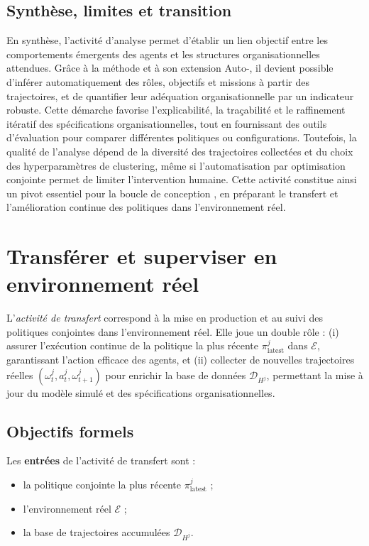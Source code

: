 \section{Synthèse, limites et transition}

En synthèse, l’activité d’analyse permet d’établir un lien objectif entre les comportements émergents des agents et les structures organisationnelles attendues. Grâce à la méthode  et à son extension Auto-, il devient possible d’inférer automatiquement des rôles, objectifs et missions à partir des trajectoires, et de quantifier leur adéquation organisationnelle par un indicateur robuste. Cette démarche favorise l’explicabilité, la traçabilité et le raffinement itératif des spécifications organisationnelles, tout en fournissant des outils d’évaluation pour comparer différentes politiques ou configurations. Toutefois, la qualité de l’analyse dépend de la diversité des trajectoires collectées et du choix des hyperparamètres de clustering, même si l’automatisation par optimisation conjointe permet de limiter l’intervention humaine. Cette activité constitue ainsi un pivot essentiel pour la boucle de conception , en préparant le transfert et l’amélioration continue des politiques dans l’environnement réel.


\clearpage
\thispagestyle{empty}
\null
\newpage

\chapter{Transférer et superviser en environnement réel}
\label{chap:transferring}

L'\textit{activité de transfert} correspond à la mise en production et au suivi des politiques conjointes dans l’environnement réel.
Elle joue un double rôle : (i) assurer l’exécution continue de la politique la plus récente $\pi^j_{\text{latest}}$ dans $\mathcal{E}$, garantissant l’action efficace des agents, et (ii) collecter de nouvelles trajectoires réelles $(\omega^j_t, a^j_t, \omega^j_{t+1})$ pour enrichir la base de données $\mathcal{D}_{H^j}$, permettant la mise à jour du modèle simulé et des spécifications organisationnelles.

\section*{Objectifs formels}

Les \textbf{entrées} de l’activité de transfert sont :
\begin{itemize}
    \item la politique conjointe la plus récente $\pi^j_{\text{latest}}$ ;
    \item l’environnement réel $\mathcal{E}$ ;
    \item la base de trajectoires accumulées $\mathcal{D}_{H^j}$.
\end{itemize}

